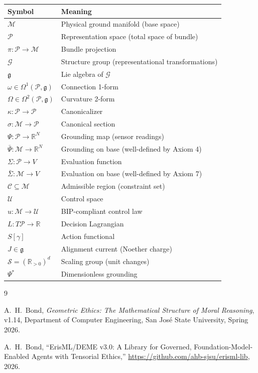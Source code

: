 \documentclass[11pt]{article}
\begin{document}
\begin{table}[h]
\centering
\begin{tabular}{@{}ll@{}}
\toprule
\textbf{Symbol} & \textbf{Meaning} \\
\midrule
$\mathcal{M}$ & Physical ground manifold (base space) \\
$\mathcal{P}$ & Representation space (total space of bundle) \\
$\pi : \mathcal{P} \to \mathcal{M}$ & Bundle projection \\
$\mathcal{G}$ & Structure group (representational transformations) \\
$\mathfrak{g}$ & Lie algebra of $\mathcal{G}$ \\
$\omega \in \Omega^1(\mathcal{P}, \mathfrak{g})$ & Connection 1-form \\
$\Omega \in \Omega^2(\mathcal{P}, \mathfrak{g})$ & Curvature 2-form \\
$\kappa : \mathcal{P} \to \mathcal{P}$ & Canonicalizer \\
$\sigma : \mathcal{M} \to \mathcal{P}$ & Canonical section \\
$\Psi : \mathcal{P} \to \mathbb{R}^N$ & Grounding map (sensor readings) \\
$\bar{\Psi} : \mathcal{M} \to \mathbb{R}^N$ & Grounding on base (well-defined by Axiom 4) \\
$\Sigma : \mathcal{P} \to V$ & Evaluation function \\
$\bar{\Sigma} : \mathcal{M} \to V$ & Evaluation on base (well-defined by Axiom 7) \\
$\mathcal{C} \subseteq \mathcal{M}$ & Admissible region (constraint set) \\
$\mathcal{U}$ & Control space \\
$u : \mathcal{M} \to \mathcal{U}$ & BIP-compliant control law \\
$L : T\mathcal{P} \to \mathbb{R}$ & Decision Lagrangian \\
$S[\gamma]$ & Action functional \\
$J \in \mathfrak{g}$ & Alignment current (Noether charge) \\
$\mathcal{S} = (\mathbb{R}_{>0})^d$ & Scaling group (unit changes) \\
$\Psi^*$ & Dimensionless grounding \\
\bottomrule
\end{tabular}
\end{table}

\begin{thebibliography}{9}

A.~H.~Bond, \emph{Geometric Ethics: The Mathematical Structure of Moral Reasoning}, v1.14, Department of Computer Engineering, San Jos\'e State University, Spring 2026.

A.~H.~Bond, ``ErisML/DEME v3.0: A Library for Governed, Foundation-Model-Enabled Agents with Tensorial Ethics,'' \url{https://github.com/ahb-sjsu/erisml-lib}, 2026.

\end{thebibliography}
\end{document}
